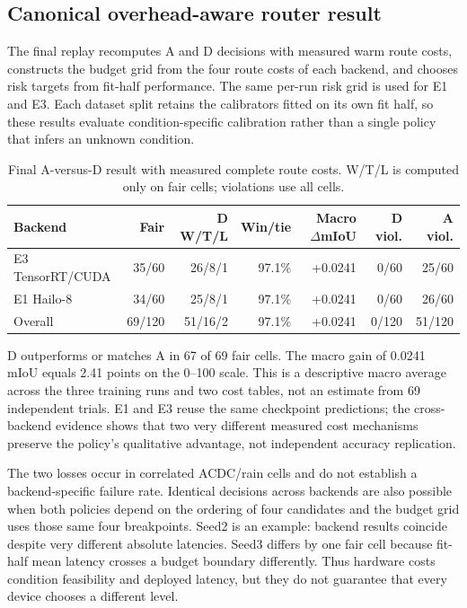 \documentclass[a4paper,review,12pt]{elsarticle}
\newcommand{\miou}{mIoU}
\begin{document}


\subsection{Canonical overhead-aware router result}

The final replay recomputes A and D decisions with measured warm route costs, constructs the budget grid from the four route costs of each backend, and chooses risk targets from fit-half performance. The same per-run risk grid is used for E1 and E3. Each dataset split retains the calibrators fitted on its own fit half, so these results evaluate condition-specific calibration rather than a single policy that infers an unknown condition.

\begin{table}[t]
\centering
\caption{Final A-versus-D result with measured complete route costs. W/T/L is computed only on fair cells; violations use all cells.}
\label{tab:routerfinal}
\small
\begin{tabular}{@{}lrrrrrr@{}}
\toprule
Backend & Fair & D W/T/L & Win/tie & Macro $\Delta$\miou{} & D viol. & A viol. \\
\midrule
E3 TensorRT/CUDA & 35/60 & 26/8/1 & 97.1\% & +0.0241 & 0/60 & 25/60 \\
E1 Hailo-8 & 34/60 & 25/8/1 & 97.1\% & +0.0241 & 0/60 & 26/60 \\
Overall & 69/120 & 51/16/2 & 97.1\% & +0.0241 & 0/120 & 51/120 \\
\bottomrule
\end{tabular}
\end{table}

D outperforms or matches A in 67 of 69 fair cells. The macro gain of 0.0241 \miou{} equals 2.41 points on the 0--100 scale. This is a descriptive macro average across the three training runs and two cost tables, not an estimate from 69 independent trials. E1 and E3 reuse the same checkpoint predictions; the cross-backend evidence shows that two very different measured cost mechanisms preserve the policy's qualitative advantage, not independent accuracy replication.

The two losses occur in correlated ACDC/rain cells and do not establish a backend-specific failure rate. Identical decisions across backends are also possible when both policies depend on the ordering of four candidates and the budget grid uses those same four breakpoints. Seed2 is an example: backend results coincide despite very different absolute latencies. Seed3 differs by one fair cell because fit-half mean latency crosses a budget boundary differently. Thus hardware costs condition feasibility and deployed latency, but they do not guarantee that every device chooses a different level.
\end{document}
